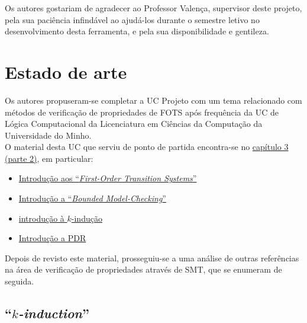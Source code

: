 \documentclass[11pt,a4paper]{report}%
\def\bmc{``\textit{Bounded Model-Checking}''\xspace}
\def\fotss{``\textit{First-Order Transition Systems}''\xspace}
\def\lc{Lógica Computacional\xspace}
\def\kind{``\textit{$k$-induction}''\xspace}
\begin{document}
Os autores gostariam de agradecer ao Professor Valença, supervisor deste projeto,
pela sua paciência infindável ao ajudá-los durante o semestre letivo no desenvolvimento
desta ferramenta, e pela sua disponibilidade e gentileza.

\chapter{Estado de arte} \label{chap:state_of_the_art} %

Os autores propuseram-se completar a UC Projeto com um tema relacionado com métodos
de verificação de propriedades de FOTS após frequência da UC de
\lc da Licenciatura em Ciências da Computação da Universidade do Minho.\\

O material desta UC \cite{lc2122} que serviu de ponto de partida encontra-se no
\href{https://paper.dropbox.com/doc/Capitulo-3-Satisfiability-Modulo-Theories-2-Parte-zorZj2G3ceOIi92zrE0n1}{capítulo 3 (parte 2)}, em particular:
\begin{itemize}
    \item \href{https://paper.dropbox.com/doc/Capitulo-3-Satisfiability-Modulo-Theories-2-Parte-zorZj2G3ceOIi92zrE0n1#:uid=621116231923798384986246&h2=Sistemas-de-Transi%C3%A7%C3%A3o-de-1%C2%AA-Or}{Introdução aos \fotss}
    \item \href{https://paper.dropbox.com/doc/Capitulo-3-Satisfiability-Modulo-Theories-2-Parte-zorZj2G3ceOIi92zrE0n1#:uid=105174620102151138688919&h2=%E2%80%9CBounded-Model-Checking%E2%80%9D-(BMC)}{Introdução a \bmc}
    \item \href{https://paper.dropbox.com/doc/Capitulo-3-Satisfiability-Modulo-Theories-2-Parte-zorZj2G3ceOIi92zrE0n1#:uid=348131220697203573201521&h2=%24%24k%24%24-induction}{introdução à $k$-indução}
    \item \href{https://paper.dropbox.com/doc/Capitulo-3-Satisfiability-Modulo-Theories-2-Parte-zorZj2G3ceOIi92zrE0n1#:uid=529328955569390400002306&h2=%E2%80%9CProperty-Directed-Reachabilit}{Introdução a PDR}
\end{itemize}
\label{state_of_art_lc_refs}

Depois de revisto este material, prosseguiu-se a uma análise de outras referências na área de
verificação de propriedades através de SMT, que se enumeram de seguida.

\section{\kind}
\label{state_of_art:kind}
\end{document}
